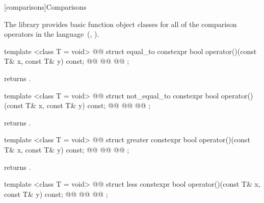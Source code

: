 \setcounter{subsection}{5}
[comparisons]{Comparisons}

\pnum
The library provides basic function object classes for all of the comparison
operators in the language~(, ).

%
\begin{itemdecl}
template <class T = void>
  @@
struct equal_to {
  constexpr bool operator()(const T& x, const T& y) const;
  @@
  @@
  @@
};
\end{itemdecl}

\begin{itemdescr}
\pnum
{} returns .
\end{itemdescr}

%
\begin{itemdecl}
template <class T = void>
  @@
struct not_equal_to {
  constexpr bool operator()(const T& x, const T& y) const;
  @@
  @@
  @@
};
\end{itemdecl}

\begin{itemdescr}
\pnum
{} returns .
\end{itemdescr}

%
\begin{itemdecl}
template <class T = void>
  @@
struct greater {
  constexpr bool operator()(const T& x, const T& y) const;
  @@
  @@
  @@
};
\end{itemdecl}

\begin{itemdescr}
\pnum
{} returns .
\end{itemdescr}

%
\begin{itemdecl}
template <class T = void>
  @@
struct less {
  constexpr bool operator()(const T& x, const T& y) const;
  @@
  @@
  @@
};
\end{itemdecl}

